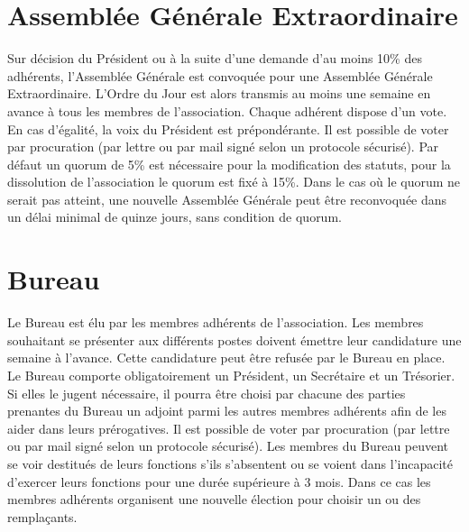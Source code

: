 \documentclass[12pt]{constitution}
\begin{document}
	\section{Assemblée Générale Extraordinaire}
	Sur décision du Président ou à la suite d'une demande d'au moins 10\% des adhérents, l'Assemblée Générale est convoquée pour une Assemblée Générale Extraordinaire. L’Ordre du Jour est alors transmis au moins une semaine en avance à tous les membres de l’association. Chaque adhérent dispose d’un vote. En cas d'égalité, la voix du Président est prépondérante. Il est possible de voter par procuration (par lettre ou par mail signé selon un protocole sécurisé). Par défaut un quorum de 5\% est nécessaire pour la modification des statuts, pour la dissolution de l'association le quorum est fixé à 15\%. Dans le cas où le quorum ne serait pas atteint, une nouvelle Assemblée Générale peut être reconvoquée dans un délai minimal de quinze jours, sans condition de quorum.

	\section{Bureau}
	Le Bureau est élu par les membres adhérents de l'association. Les membres souhaitant se présenter aux différents postes doivent émettre leur candidature une semaine à l'avance. Cette candidature peut être refusée par le Bureau en place. Le Bureau comporte obligatoirement un Président, un Secrétaire et un Trésorier. Si elles le jugent nécessaire, il pourra être choisi par chacune des parties prenantes du Bureau un adjoint parmi les autres membres adhérents afin de les aider dans leurs prérogatives. Il est possible de voter par procuration (par lettre ou par mail signé selon un protocole sécurisé). Les membres du Bureau peuvent se voir destitués de leurs fonctions s'ils s'absentent ou se voient dans l'incapacité d'exercer leurs fonctions pour une durée supérieure à 3 mois. Dans ce cas les membres adhérents organisent une nouvelle élection pour choisir un ou des remplaçants.\\
\end{document}
